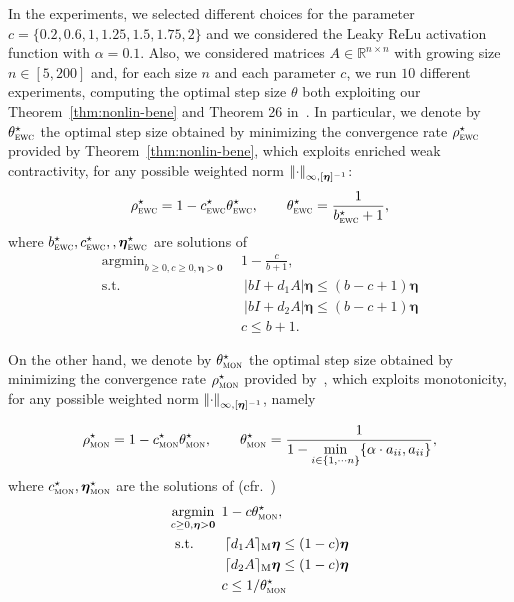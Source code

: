 \documentclass[journal,twoside,web]{ieeecolor}
\DeclareMathOperator*{\argmin}{argmin}
\newcommand{\mzr}[1]{\lceil#1\rceil_{\text{M}}}
\newcommand{\abs}[1]{{\left\vert #1 \right\vert}}
\newcommand{\norm}[1]{{\left\vert\kern-0.25ex\left\vert #1\right\vert\kern-0.25ex\right\vert}}
\newcommand{\rea }{\mathbb{R}}
\newcommand{\etab}{\boldsymbol{\eta}}
\newcommand{\bzero}{\boldsymbol{0}}
\begin{document}
In the experiments, we selected different choices for the parameter ${c=\{0.2,0.6,1,1.25,1.5,1.75,2\}}$ and we considered the Leaky ReLu activation function with $\alpha=0.1$. Also, we considered matrices $A\in\rea^{n\times n}$ with growing size ${n\in[5,200]}$ and, for each size $n$ and each parameter $c$, we run $10$ different experiments, computing the optimal step size $\theta$ both exploiting our Theorem~\ref{thm:nonlin-bene} and Theorem 26 in~\cite{davydov2024non}.
%
In particular, we denote by $\theta^{\star}_{\textsc{ewc}}$ the optimal step size obtained by minimizing the convergence rate $\rho^\star_{\textsc{ewc}}$ provided by Theorem~\ref{thm:nonlin-bene}, which exploits enriched weak contractivity, for any possible weighted norm $\norm{\cdot}_{\infty,[\etab]^{-1}}$:
%
$$
\rho^\star_{\textsc{ewc}} =1- c^\star_{\textsc{ewc}}\theta^\star_{\textsc{ewc}},\qquad \theta^{\star}_{\textsc{ewc}} = \frac{1}{b^\star_{\textsc{ewc}} +1}, 
$$
%
where $b^\star_{\textsc{ewc}},c^\star_{\textsc{ewc}},,\etab^\star_{\textsc{ewc}}$ are solutions of
%
$$
\begin{aligned}
\argmin_{b\geq0, c\geq 0,\etab>\bzero} \:\: & 
1-\frac{c}{b+1},\\
\text{s.t.} \qquad \quad &\:\abs{b I + d_1A}\etab  \leq (b-c+1)\etab\\
& \: \abs{b I + d_2A}\etab  \leq (b-c+1)\etab\\
& c\leq b+1.%
\end{aligned}
$$

On the other hand, we denote by $\theta^{\star}_{\textsc{mon}}$ the optimal step size obtained by minimizing the convergence rate $\rho^\star_{\textsc{mon}}$ provided by~\cite[Theorem 26(ii)]{davydov2024non}, which exploits monotonicity, for any possible weighted norm $\norm{\cdot}_{\infty,[\etab]^{-1}}$, namely

$$
\rho^\star_{\textsc{mon}} =1- c^\star_{\textsc{mon}}\theta^\star_{\textsc{mon}},\qquad \theta^{\star}_{\textsc{mon}} = \frac{1}{1-\displaystyle \min_{i\in\{1,\cdots n\}}\{\alpha\cdot a_{ii},a_{ii}\}}, 
$$
%
where $c^\star_{\textsc{mon}},\etab^\star_{\textsc{mon}}$ are the solutions of (cfr.~\cite[Theorem 21(ii)]{davydov2024NN})
%
$$
\begin{aligned}
\argmin_{c\geq 0,\etab>\bzero} \:\: & 
1-c\theta^\star_{\textsc{mon}},\\
\text{s.t.} \qquad &\: \mzr{d_1A}\etab \leq (1-c) \etab\\
&\: \mzr{d_2A}\etab \leq (1-c) \etab\\
& c \leq  1/\theta^{\star}_{\textsc{mon}}%
\end{aligned}
$$
\end{document}
